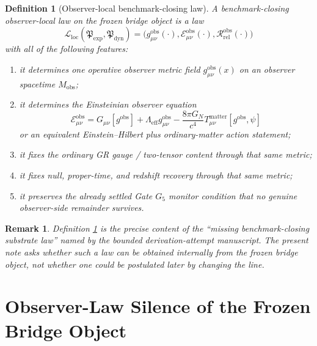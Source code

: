 \documentclass[11pt]{article}
\newcommand{\ExplicitPackage}{\mathfrak P_{\mathrm{exp}}}
\newcommand{\PrimitiveFamily}{\mathfrak P_{\mathrm{dyn}}}
\newcommand{\ObsMan}{M_{\mathrm{obs}}}
\newcommand{\GateFive}{G_{5}}
\newcommand{\LocalBridgeLaw}{\mathcal L_{\mathrm{loc}}}
\newtheorem{definition}{Definition}
\newtheorem{remark}{Remark}
\begin{document}
\begin{definition}[Observer-local benchmark-closing law]
\label{def:local}
A \emph{benchmark-closing observer-local law} on the frozen bridge object is a law
\[
\LocalBridgeLaw(\ExplicitPackage,\PrimitiveFamily)
=
\bigl(
g_{\mu\nu}^{\mathrm{obs}}(\cdot),
\mathcal E_{\mu\nu}^{\mathrm{obs}}(\cdot),
\mathcal R_{\mathrm{rel}}^{\mathrm{obs}}(\cdot)
\bigr)
\]
with all of the following features:
\begin{enumerate}
    \item it determines one operative observer metric field \(g_{\mu\nu}^{\mathrm{obs}}(x)\) on an observer spacetime \(\ObsMan\);
    \item it determines the Einsteinian observer equation
    \[
    \mathcal E_{\mu\nu}^{\mathrm{obs}}
    =
    G_{\mu\nu}[g^{\mathrm{obs}}]
    +\Lambda_{\mathrm{eff}}g_{\mu\nu}^{\mathrm{obs}}
    -\frac{8\pi G_N}{c^4}T_{\mu\nu}^{\mathrm{matter}}[g^{\mathrm{obs}},\psi]
    \]
    or an equivalent Einstein--Hilbert plus ordinary-matter action statement;
    \item it fixes the ordinary GR gauge / two-tensor content through that same metric;
    \item it fixes null, proper-time, and redshift recovery through that same metric;
    \item it preserves the already settled Gate \(\GateFive\) monitor condition that no genuine observer-side remainder survives.
\end{enumerate}
\end{definition}

\begin{remark}
Definition \ref{def:local} is the precise content of the ``missing benchmark-closing substrate law'' named by the bounded derivation-attempt manuscript. The present note asks whether such a law can be obtained \emph{internally} from the frozen bridge object, not whether one could be postulated later by changing the line.
\end{remark}

\section{Observer-Law Silence of the Frozen Bridge Object}
\end{document}
